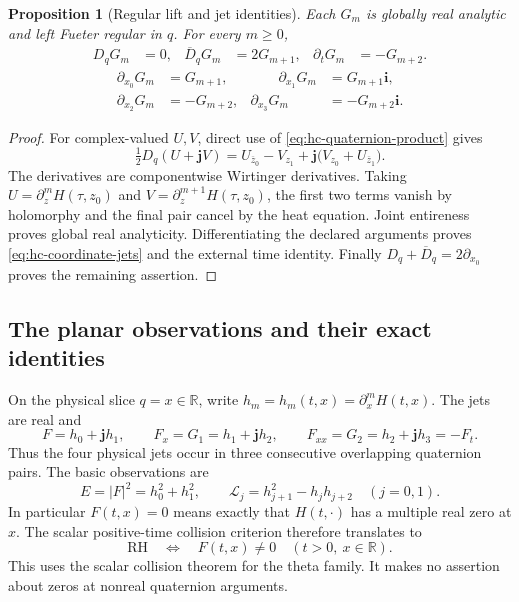 \documentclass[11pt]{article}
\numberwithin{equation}{section}
\newtheorem{proposition}[theorem]{Proposition}
\theoremstyle{definition}
\theoremstyle{remark}
\newcommand{\R}{\mathbb R}
\newcommand{\ii}{\mathbf i}
\newcommand{\jj}{\mathbf j}
\begin{document}
\begin{proposition}[Regular lift and jet identities]
\label{prop:hc-fueter}
Each \(G_m\) is globally real analytic and left Fueter regular in \(q\).
For every \(m\ge0\),
\begin{align}
 D_qG_m&=0,&\overline D_qG_m&=2G_{m+1},&
 \partial_tG_m&=-G_{m+2}.\label{eq:hc-jet-operators}
\end{align}
\begin{equation}
 \begin{aligned}
 \partial_{x_0}G_m&=G_{m+1},&\qquad
 \partial_{x_1}G_m&=G_{m+1}\ii,\\
 \partial_{x_2}G_m&=-G_{m+2},&
 \partial_{x_3}G_m&=-G_{m+2}\ii.
 \end{aligned}
 \label{eq:hc-coordinate-jets}
\end{equation}
\end{proposition}
\begin{proof}
For complex-valued \(U,V\), direct use of
\eqref{eq:hc-quaternion-product} gives
\[
 \tfrac12D_q(U+\jj V)
 =U_{\overline z_0}-V_{z_1}
              +\jj\bigl(V_{z_0}+U_{\overline z_1}\bigr).
\]
The derivatives are componentwise Wirtinger derivatives. Taking
\(U=\partial_z^mH(\tau,z_0)\) and
\(V=\partial_z^{m+1}H(\tau,z_0)\), the first two terms vanish by
holomorphy and the final pair cancel by the heat equation. Joint
entireness proves global real analyticity. Differentiating the declared
arguments proves \eqref{eq:hc-coordinate-jets} and the external time
identity. Finally \(D_q+\overline D_q=2\partial_{x_0}\) proves the
remaining assertion.
\end{proof}

\subsection{The planar observations and their exact identities}

On the physical slice \(q=x\in\R\), write
\(h_m=h_m(t,x)=\partial_x^mH(t,x)\). The jets are real and
\begin{equation}
 F=h_0+\jj h_1,\qquad F_x=G_1=h_1+\jj h_2,
 \qquad F_{xx}=G_2=h_2+\jj h_3=-F_t.
 \label{eq:hc-physical-jets}
\end{equation}
Thus the four physical jets occur in three consecutive overlapping
quaternion pairs. The basic observations are
\begin{equation}
 E=|F|^2=h_0^2+h_1^2,\qquad
 \mathcal L_j=h_{j+1}^2-h_jh_{j+2}\quad(j=0,1).
 \label{eq:hc-observations}
\end{equation}
In particular \(F(t,x)=0\) means exactly that \(H(t,\cdot)\) has a multiple
real zero at \(x\). The scalar positive-time collision criterion therefore
translates to
\[
 \mathrm{RH}\quad\Longleftrightarrow\quad
 F(t,x)\ne0\quad(t>0,\ x\in\R).
\]
This uses the scalar collision theorem for the theta family. It makes
no assertion about zeros at nonreal quaternion arguments.
\end{document}
